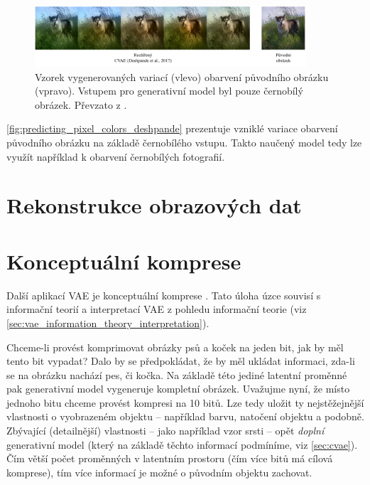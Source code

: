 \begin{figure}[H]
    \centering
    \includegraphics[width=0.9\textwidth]{figures/applications/predicting_pixel_colors_deshpande.pdf}
    \caption{Vzorek vygenerovaných variací (vlevo) obarvení původního obrázku (vpravo). Vstupem pro generativní model byl pouze černobílý obrázek. Převzato z \cite{Deshpande2017}.}
    \label{fig:predicting_pixel_colors_deshpande}
\end{figure}

\autoref{fig:predicting_pixel_colors_deshpande} prezentuje vzniklé variace obarvení původního obrázku na základě černobílého vstupu.
Takto naučený model tedy lze využít například k obarvení černobílých fotografií.

\newpage
\section{Rekonstrukce obrazových dat}

\newpage
\section{Konceptuální komprese}
Další aplikací VAE je konceptuální komprese \cite{Gregor2016}. Tato úloha úzce souvisí s informační teorií a interpretací VAE z pohledu informační teorie (viz \autoref{sec:vae_information_theory_interpretation}).

Chceme-li provést komprimovat obrázky psů a koček na jeden bit, jak by měl tento bit vypadat?
Dalo by se předpokládat, že by měl ukládat informaci, zda-li se na obrázku nachází pes, či kočka. 
Na základě této jediné latentní proměnné pak generativní model vygeneruje kompletní obrázek.
Uvažujme nyní, že místo jednoho bitu chceme provést kompresi na 10 bitů.
Lze tedy uložit ty nejstěžejnější vlastnosti o vyobrazeném objektu  – například barvu, natočení objektu a podobně.
Zbývající (detailnější) vlastnosti – jako například vzor srsti – opět \emph{doplní} generativní model (který na základě těchto informací podmíníme, viz \autoref{sec:cvae}).
Čím větší počet proměnných v latentním prostoru (čím více bitů má cílová komprese), tím více informací je možné o původním objektu zachovat. \cite{Gregor2016}

